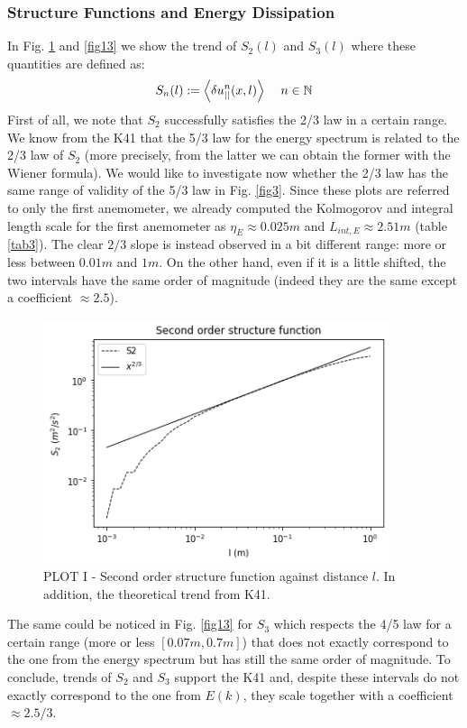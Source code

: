 \documentclass[11pt,titlepage]{article}
\begin{document}
\subsubsection{Structure Functions and Energy Dissipation}\label{structure_functions}
In Fig. \ref{fig12} and  \ref{fig13} we show the trend of $S_2(l)$ and $S_3(l)$ where these quantities are defined as:
\begin{equation*}
	S_n(l):= \left< \delta u_{||}^n(x,l) \right> \hspace{4mm} n \in \mathbb{N}
\end{equation*}
First of all, we note that $S_2$ successfully satisfies the 2/3 law in a certain range. We know from the K41 that the 5/3 law for the energy spectrum is related to the 2/3 law of $S_2$ (more precisely, from the latter we can obtain the former with the Wiener formula). We would like to investigate now whether the 2/3 law has the same range of validity of the 5/3 law in Fig. \ref{fig3}. Since these plots are referred to only the first anemometer, we already computed the Kolmogorov and integral length scale for the first anemometer as $\eta_E \approx 0.025m$ and $L_{int,E} \approx 2.51m$ (table \ref{tab3}). The clear $2/3$ slope is instead observed in a bit different range: more or less between $0.01m$ and $1m$. On the other hand, even if it is a little shifted, the two intervals have the same order of magnitude (indeed they are the same except a coefficient $\approx 2.5$).
\begin{center}
	\begin{figure} [h]
		\centering
		\includegraphics[width = 4in]{./figures/ex1_7_1.png}
		\caption{PLOT I - Second order structure function against distance $l$. In addition, the theoretical trend from K41.}
		\label{fig12}
	\end{figure}
\end{center}
The same could be noticed in Fig. \ref{fig13} for $S_3$ which respects the 4/5 law for a certain range (more or less $[0.07m, 0.7m]$) that does not exactly correspond to the one from the energy spectrum but has still the same order of magnitude. To conclude, trends of $S_2$ and $S_3$ support the K41 and, despite these intervals do not exactly correspond to the one from $E(k)$, they scale together with a coefficient $\approx 2.5/3$. 
\end{document}
